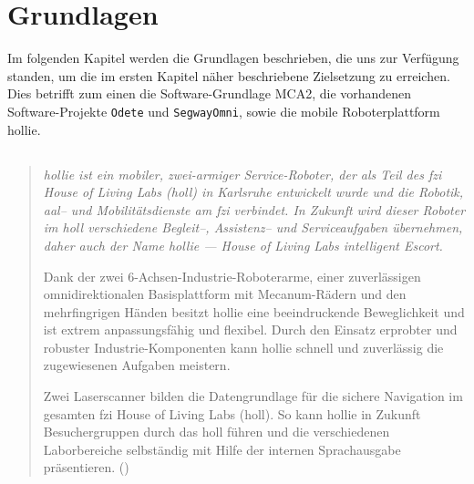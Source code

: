 \chapter{Grundlagen}
\label{grundlagen_cha}

Im folgenden Kapitel werden die Grundlagen beschrieben, die uns zur Verfügung standen, um die im ersten Kapitel näher beschriebene Zielsetzung zu erreichen.
Dies betrifft zum einen die Software-Grundlage MCA2, die vorhandenen Software-Projekte \lstinline{Odete} und \lstinline{SegwayOmni}, sowie die mobile Roboterplattform \gls{hollie}.
 
\section{}
\label{grundlagen_hollie_sec}
\authorsection{\editorjulian, \editortobias}
\begin{quotation}
\itshape
\gls{hollie} ist ein mobiler, zwei-armiger Service-Roboter, der als Teil des \gls{fzi} House of Living Labs (\gls{holl}) in Karlsruhe entwickelt wurde und die Robotik, \gls{aal}-- und Mobilitätsdienste am \gls{fzi} verbindet. In Zukunft wird dieser Roboter im \gls{holl} verschiedene Begleit--, Assistenz-- und Serviceaufgaben übernehmen, daher auch der Name \gls{hollie} --- \glqq House of Living Labs intelligent Escort\grqq .

Dank der zwei 6-Achsen-Industrie-Roboterarme, einer zuverlässigen omnidirektionalen Basisplattform mit Mecanum-Rädern und den mehrfingrigen Händen besitzt \gls{hollie} eine beeindruckende Beweglichkeit und ist extrem anpassungsfähig und flexibel. Durch den Einsatz erprobter und robuster Industrie-Komponenten kann \gls{hollie} schnell und zuverlässig die zugewiesenen Aufgaben meistern.

Zwei Laserscanner bilden die Datengrundlage für die sichere Navigation im gesamten \gls{fzi} House of Living Labs (\gls{holl}). So kann \gls{hollie} in Zukunft Besuchergruppen durch das \gls{holl} führen und die verschiedenen Laborbereiche selbständig mit Hilfe der internen Sprachausgabe präsentieren.
\normalfont(\cite{fziHoll2})
\end{quotation}

